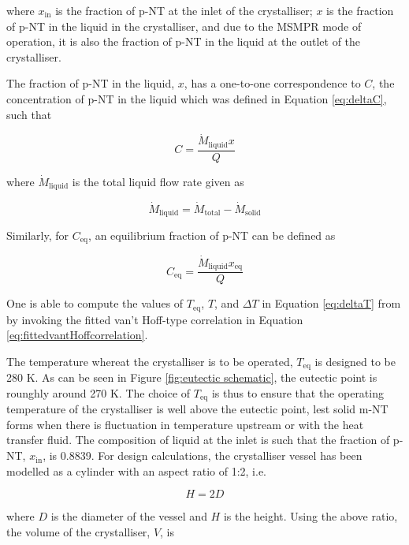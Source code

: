\noindent where $x_{\mathrm{in}}$ is the fraction of p-NT at the inlet of the crystalliser; $x$ is the fraction of p-NT in the liquid in the crystalliser, and due to the MSMPR mode of operation, it is also the fraction of p-NT in the liquid at the outlet of the crystalliser.

The fraction of p-NT in the liquid, $x$, has a one-to-one correspondence to $C$, the concentration of p-NT in the liquid which was defined in Equation \ref{eq:deltaC}, such that 

\begin{equation}
    C = \frac{\dot{M}_{\mathrm{liquid}} x}{Q}
\end{equation}

\noindent where $\dot{M}_{\mathrm{liquid}}$ is the total liquid flow rate given as 

\begin{equation}
    \dot{M}_{\mathrm{liquid}} = \dot{M}_{\mathrm{total}} - \dot{M}_{\mathrm{solid}}
\end{equation}

\noindent Similarly, for $C_{\mathrm{eq}}$, an equilibrium fraction of p-NT can be defined as

\begin{equation}
    C_{\mathrm{eq}} = \frac{\dot{M}_{\mathrm{liquid}} x_{\mathrm{eq}}}{Q}
\end{equation}

\noindent One is able to compute the values of $T_{\mathrm{eq}}$, $T$, and $\Delta T$ in Equation \ref{eq:deltaT} from by invoking the fitted van't Hoff-type correlation in Equation \ref{eq:fittedvantHoffcorrelation}. 

The temperature whereat the crystalliser is to be operated, $T_{\mathrm{eq}}$ is designed to be 280 K. As can be seen in Figure \ref{fig:eutectic schematic}, the eutectic point is rounghly around 270 K. The choice of $T_{\mathrm{eq}}$ is thus to ensure that the operating temperature of the crystalliser is well above the eutectic point, lest solid m-NT forms when there is fluctuation in temperature upstream or with the heat transfer fluid. The composition of liquid at the inlet is such that the fraction of p-NT, $x_{\mathrm{in}}$, is 0.8839. For design calculations, the crystalliser vessel has been modelled as a cylinder with an aspect ratio of 1:2, i.e. 

\begin{equation}
    H = 2D
\end{equation}

\noindent where $D$ is the diameter of the vessel and $H$ is the height. Using the above ratio, the volume of the crystalliser, $V$, is

